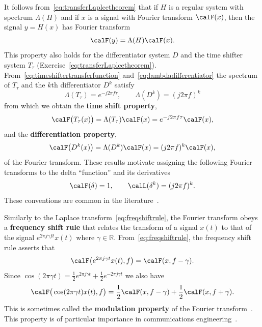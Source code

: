 \documentclass[11pt,a4paper]{book}
\theoremstyle{plain}
\numberwithin{equation}{section}
\newcommand{\reals}{{\mathbb R}}
\newcommand{\term}{\textbf}
\begin{document}
It follows from~\eqref{eq:transferLaplcetheorem} that if $H$ is a regular system with spectrum $\Lambda(H)$ and if $x$ is a signal with Fourier transform $\calF(x)$, then the signal $y = H(x)$ has Fourier transform
\[
\calF(y) = \Lambda(H) \calF(x).
\]
This property also holds for the differentiator system $D$ and the time shifter system $T_\tau$ (Exercise~\ref{eq:transferLaplcetheorem}).  From~\eqref{eq:timeshiftertransferfunction} and~\eqref{eq:lambdadifferentiator} the spectrum of $T_\tau$ and the $k$th differentiator $D^k$ satisfy
\[
\Lambda(T_\tau) = e^{-j2\pi f \tau}, \qquad \Lambda(D^k) = (j2\pi f)^k
\]
from which we obtain the \term{time shift property},
 \[
 \calF\big(T_\tau(x)\big) = \Lambda(T_\tau) \calF(x) = e^{-j2\pi f \tau} \calF(x),
\]
and the \term{differentiation property},
\[
 \calF\big(D^k(x)\big) = \Lambda(D^k) \calF(x) =  (j2\pi f)^k \calF(x),
\]
of the Fourier transform.  These results motivate assigning the following Fourier transforms to the delta ``function'' and its derivatives
\begin{equation}\label{eqftsofdeltas}
\calF(\delta) = 1, \qquad \calL(\delta^k) = (j2\pi f)^k.
\end{equation}
These conventions are common in the literature~\citep{Oppenheiim_sigs_sys_1996}.  

Similarly to the Laplace transform~\eqref{eq:freqshiftrule}, the Fourier transform obeys a \term{frequency shift rule} that relates the transform of a signal $x(t)$ to that of the signal $e^{2\pi j \gamma f t} x(t)$ where $\gamma \in \reals$.  From~\eqref{eq:freqshiftrule}, the frequency shift rule asserts that
\begin{align}
\calF\big( e^{2\pi j \gamma t} x(t), f\big) =  \calF(x, f - \gamma). \label{eq:freqshiftrulefourier}
\end{align}
Since $\cos( 2\pi \gamma t) = \tfrac{1}{2}e^{2\pi j \gamma t} + \tfrac{1}{2}e^{-2\pi j \gamma t}$ we also have
\begin{equation}\label{eq:modulationpropertyft}
\calF\big( \cos(2\pi \gamma t) x(t), f \big) =  \frac{1}{2}\calF(x, f - \gamma) + \frac{1}{2}\calF(x, f + \gamma).
\end{equation}
This is sometimes called the \term{modulation property} of the Fourier transform~\cite[page~61]{Papoulis_signal_analysis_1977}.  This property is of particular importance in communications engineering~\citep{Proakis_digital_comms}.  %
\end{document}
